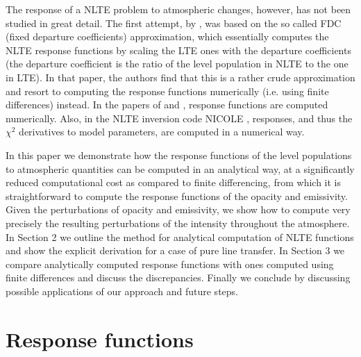 \documentclass[referee]{aa}
\begin{document}
The response of a NLTE problem to atmospheric changes, however, has not been studied in great detail. The first attempt, by \citet{HectorI}, was based on the so called FDC (fixed departure coefficients) approximation, which essentially computes the NLTE response functions by scaling the LTE ones with the departure coefficients (the departure coefficient is the ratio of the level population in NLTE to the one in LTE). In that paper, the authors find that this is a rather crude approximation and resort to computing the response functions numerically (i.e. using finite differences) instead. In the papers of \citet{Hector_halpha} and \citet{Han06}, response functions are computed numerically. Also, in the NLTE inversion code NICOLE \citep{NICOLE}, responses, and thus the $\chi^2$ derivatives to model parameters, are computed in a numerical way.

In this paper we demonstrate how the response functions of the level populations to atmospheric quantities can be computed in an analytical way, at a significantly reduced computational cost as compared to finite differencing, from which it is straightforward to compute the response functions of the opacity and emissivity. Given the perturbations of opacity and emissivity, we show how to compute very precisely the resulting perturbations of the intensity throughout the atmosphere. In Section 2 we outline the method for analytical computation of NLTE functions and show the explicit derivation for a case of pure line transfer. In Section 3 we compare analytically computed response functions with ones computed using finite differences and discuss the discrepancies. Finally we conclude by discussing possible applications of our approach and future steps. 

\section{Response functions}
\label{concept}
\end{document}
